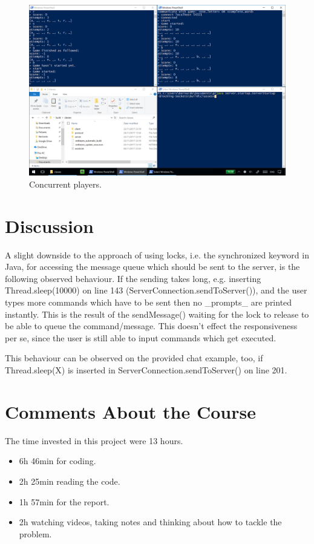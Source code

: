 \documentclass[a4paper]{scrartcl}
\begin{document}
\begin{figure}[h!]
  \begin{center}
    \includegraphics[scale=0.1]{multiple.png}
    \caption{Concurrent players.}
    \label{fig:multiple}
  \end{center}
\end{figure}

\section{Discussion}


A slight downside to the approach of using locks, i.e. the synchronized keyword in Java, for accessing the message queue which should be sent to the server, is the following observed behaviour.
If the sending takes long, e.g. inserting Thread.sleep(10000) on line 143 (ServerConnection.sendToServer()), and the user types more commands which have to be sent then no _prompts_ are printed instantly.
This is the result of the sendMessage() waiting for the lock to release to be able to queue the command/message.
This doesn't effect the responsiveness per se, since the user is still able to input commands which get executed.

This behaviour can be observed on the provided chat example, too, if Thread.sleep(X) is inserted in ServerConnection.sendToServer() on line 201.


\section{Comments About the Course}

The time invested in this project were 13 hours.
\begin{itemize}
        \item 6h 46min for coding.
        \item 2h 25min reading the code.
        \item 1h 57min for the report.
        \item 2h watching videos, taking notes and thinking about how to tackle the problem.
\end{itemize}
\end{document}
